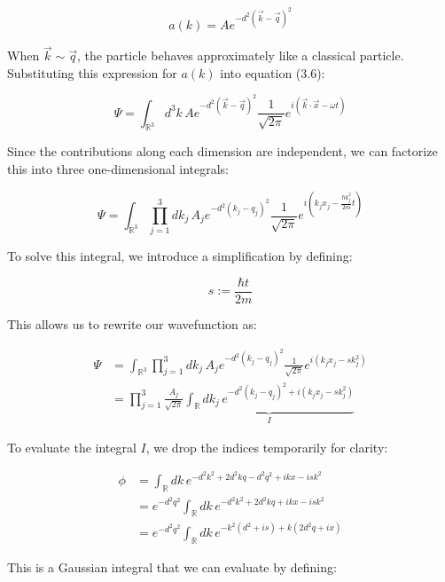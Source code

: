 \documentclass[10pt]{article}
\begin{document}
\begin{equation*}
a(k) = Ae^{-d^2(\vec{k}-\vec{q})^2} \tag{3.9}
\end{equation*}

When $\vec{k} \sim \vec{q}$, the particle behaves approximately like a classical particle. Substituting this expression for $a(k)$ into equation (3.6):

\begin{equation*}
\Psi = \int_{\mathbb{R}^3}d^3k\,Ae^{-d^2(\vec{k}-\vec{q})^2}\frac{1}{\sqrt{2\pi}}e^{i(\vec{k}\cdot\vec{x}-\omega t)} \tag{3.10}
\end{equation*}

Since the contributions along each dimension are independent, we can factorize this into three one-dimensional integrals:

\begin{equation*}
\Psi = \int_{\mathbb{R}^3}\prod_{j=1}^3 dk_j\,A_je^{-d^2(k_j-q_j)^2}\frac{1}{\sqrt{2\pi}}e^{i(k_jx_j-\frac{\hbar k_j^2}{2m}t)} \tag{3.11}
\end{equation*}


To solve this integral, we introduce a simplification by defining:

\begin{equation*}
s := \frac{\hbar t}{2m} \tag{3.12}
\end{equation*}

This allows us to rewrite our wavefunction as:

\begin{align*}
\Psi &= \int_{\mathbb{R}^3}\prod_{j=1}^3dk_j\,A_je^{-d^2(k_j-q_j)^2}\frac{1}{\sqrt{2\pi}}e^{i(k_jx_j-sk_j^2)} \\
&= \prod_{j=1}^3\frac{A_j}{\sqrt{2\pi}}\underbrace{\int_{\mathbb{R}}dk_j\,e^{-d^2(k_j-q_j)^2+i(k_jx_j-sk_j^2)}}_{I} \tag{3.13}
\end{align*}

To evaluate the integral $I$, we drop the indices temporarily for clarity:

\begin{align*}
\phi &= \int_{\mathbb{R}}dk\,e^{-d^2k^2+2d^2kq-d^2q^2+ikx-isk^2} \\
&= e^{-d^2q^2}\int_{\mathbb{R}}dk\,e^{-d^2k^2+2d^2kq+ikx-isk^2} \tag{3.14} \\
&= e^{-d^2q^2}\int_{\mathbb{R}}dk\,e^{-k^2(d^2+is)+k(2d^2q+ix)}
\end{align*}

This is a Gaussian integral that we can evaluate by defining:
\end{document}
